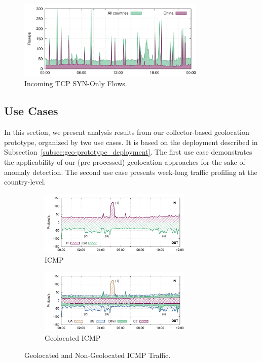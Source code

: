 \begin{figure}[!tb]
    \centering
    \includegraphics[width=0.8\textwidth]{figures/paper-geolocation/ctry-cn-tw/flows}
    \caption{Incoming TCP SYN-Only Flows.}
    \label{fig:geo-tcp-syn}
\end{figure}

\subsection{Use Cases} \label{subsec:geo-use_cases}

In this section, we present analysis results from our collector-based geolocation prototype, organized by two use cases. It is based on the deployment described in Subsection~\ref{subsec:geo-prototype_deployment}. The first use case demonstrates the applicability of our (pre-processed) geolocation approaches for the sake of anomaly detection. The second use case presents week-long traffic profiling at the country-level.

\begin{figure}[!tb]
    \begin{subfigure}[t]{\textwidth}
        \centering
        \includegraphics[width=0.8\textwidth]{figures/paper-geolocation/icmp/packets}
        \caption{ICMP}
        \label{fig:geo-icmp-traffic}
    \end{subfigure}%
    \hfill
    \begin{subfigure}[t]{\textwidth}
        \centering
        \includegraphics[width=0.8\textwidth]{figures/paper-geolocation/icmp-geo/packets}
        \caption{Geolocated ICMP}
        \label{fig:geo-icmp-geo-traffic}
    \end{subfigure}
    \caption{Geolocated and Non-Geolocated ICMP Traffic.}
    \label{fig:geo-icmp}
\end{figure}

